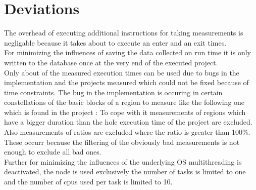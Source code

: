 \section{Deviations}
The overhead of executing additional instructions for taking measurements is negligable because it takes about \draftnote{\measurementOverhead} to execute an enter and an exit \draftnote{\overheadIterations} times.\\
For minimizing the influences of saving the data collected on run time it is only written to the database once at the very end of the executed project.\\
Only about \draftnote{\usefulRatio} of the measured execution times can be used due to bugs in the implementation and the projects measured which could not be fixed because of time constraints.
The bug in the implementation is occuring in certain constellations of the basic blocks of a region to measure like the following one which is found in the project :
To cope with it measurements of regions which have a bigger duration than the hole execution time of the project are excluded.
Also measurements of ratios are excluded where the ratio is greater than 100\%.
These occurr because the filtering of the obviously bad measurements is not enough to exclude all bad ones.\\
Further for minimizing the influences of the underlying OS multithreading is deactivated, the node is used exclusively the number of tasks is limited to one and the number of cpus used per task is limited to 10.
